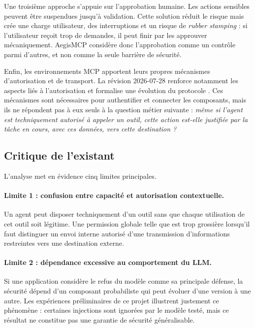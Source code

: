Une troisième approche s'appuie sur l'approbation humaine. Les actions sensibles peuvent être suspendues jusqu'à validation. Cette solution réduit le risque mais crée une charge utilisateur, des interruptions et un risque de \textit{rubber stamping} : si l'utilisateur reçoit trop de demandes, il peut finir par les approuver mécaniquement. AegisMCP considère donc l'approbation comme un contrôle parmi d'autres, et non comme la seule barrière de sécurité.

Enfin, les environnements MCP apportent leurs propres mécanismes d'autorisation et de transport. La révision 2026-07-28 renforce notamment les aspects liés à l'autorisation et formalise une évolution du protocole \cite{mcp2026}. Ces mécanismes sont nécessaires pour authentifier et connecter les composants, mais ils ne répondent pas à eux seuls à la question métier suivante : \emph{même si l'agent est techniquement autorisé à appeler un outil, cette action est-elle justifiée par la tâche en cours, avec ces données, vers cette destination ?}

\subsection{Critique de l'existant}

L'analyse met en évidence cinq limites principales.

\paragraph{Limite 1 : confusion entre capacité et autorisation contextuelle.}
Un agent peut disposer techniquement d'un outil sans que chaque utilisation de cet outil soit légitime. Une permission globale telle que  est trop grossière lorsqu'il faut distinguer un envoi interne autorisé d'une transmission d'informations restreintes vers une destination externe.

\paragraph{Limite 2 : dépendance excessive au comportement du LLM.}
Si une application considère le refus du modèle comme sa principale défense, la sécurité dépend d'un composant probabiliste qui peut évoluer d'une version à une autre. Les expériences préliminaires de ce projet illustrent justement ce phénomène : certaines injections sont ignorées par le modèle testé, mais ce résultat ne constitue pas une garantie de sécurité généralisable.

